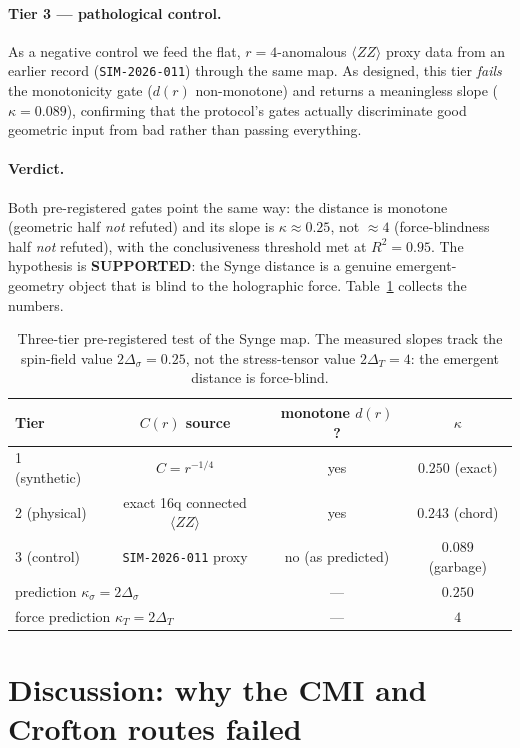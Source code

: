 \documentclass[11pt]{article}
\begin{document}
\paragraph{Tier 3 --- pathological control.}
As a negative control we feed the flat, $r=4$-anomalous $\langle ZZ\rangle$ proxy data from
an earlier record (\texttt{SIM-2026-011}) through the same map. As designed, this tier
\emph{fails} the monotonicity gate ($d(r)$ non-monotone) and returns a meaningless slope
($\kappa=0.089$), confirming that the protocol's gates actually discriminate good geometric
input from bad rather than passing everything.

\paragraph{Verdict.}
Both pre-registered gates point the same way: the distance is monotone (geometric half
\emph{not} refuted) and its slope is $\kappa\approx0.25$, not $\approx4$ (force-blindness
half \emph{not} refuted), with the conclusiveness threshold met at $R^{2}=0.95$. The
hypothesis is \textbf{SUPPORTED}: the Synge distance is a genuine emergent-geometry object
that is blind to the holographic force. Table~\ref{tab:results} collects the numbers.

\begin{table}[h]
  \centering
  \begin{tabular}{lccc}
    \hline
    Tier & $C(r)$ source & monotone $d(r)$? & $\kappa$ \\
    \hline
    1 (synthetic) & $C=r^{-1/4}$ & yes & $0.250$ (exact) \\
    2 (physical)  & exact 16q connected $\langle ZZ\rangle$ & yes & $0.243$ (chord) \\
    3 (control)   & \texttt{SIM-2026-011} proxy & no (as predicted) & $0.089$ (garbage) \\
    \hline
    \multicolumn{2}{l}{prediction $\kappa_\sigma=2\Delta_\sigma$} & --- & $0.250$ \\
    \multicolumn{2}{l}{force prediction $\kappa_T=2\Delta_T$} & --- & $4$ \\
    \hline
  \end{tabular}
  \caption{Three-tier pre-registered test of the Synge map. The measured slopes track the
  spin-field value $2\Delta_\sigma=0.25$, not the stress-tensor value $2\Delta_T=4$: the
  emergent distance is force-blind.}
  \label{tab:results}
\end{table}

\section{Discussion: why the CMI and Crofton routes failed}
\label{sec:discussion}
\end{document}
